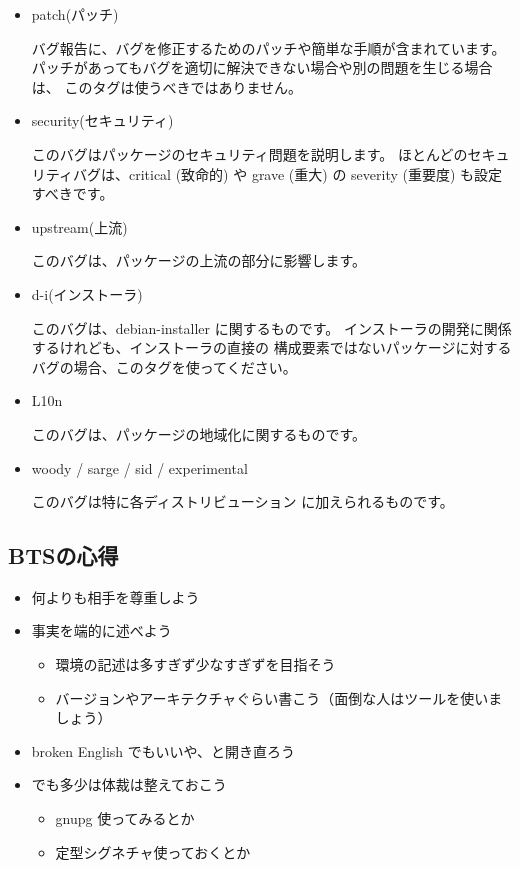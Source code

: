 \documentclass[mingoth,a4paper]{jsarticle}
\begin{document}
\begin{itemize}
\item patch(パッチ)

バグ報告に、バグを修正するためのパッチや簡単な手順が含まれています。 パッチがあってもバグを適切に解決できない場合や別の問題を生じる場合は、 このタグは使うべきではありません。 

\item security(セキュリティ)

このバグはパッケージのセキュリティ問題を説明します。 ほとんどのセキュリティバグは、critical (致命的) や grave (重大) の severity (重要度) も設定すべきです。 

\item upstream(上流)

このバグは、パッケージの上流の部分に影響します。

\item d-i(インストーラ)

 このバグは、debian-installer に関するものです。 インストーラの開発に関係するけれども、インストーラの直接の 構成要素ではないパッケージに対するバグの場合、このタグを使ってください。 

\item L10n

このバグは、パッケージの地域化に関するものです。 

\item woody / sarge / sid / experimental

このバグは特に各ディストリビューション に加えられるものです。
\end{itemize}

\subsection{BTSの心得}

\begin{itemize}
\item 何よりも相手を尊重しよう
\item 事実を端的に述べよう
\begin{itemize}
\item 環境の記述は多すぎず少なすぎずを目指そう
\item バージョンやアーキテクチャぐらい書こう（面倒な人はツールを使いましょう）
\end{itemize}
\item broken English でもいいや、と開き直ろう
\item でも多少は体裁は整えておこう
\begin{itemize}
\item gnupg 使ってみるとか
\item 定型シグネチャ使っておくとか
\end{itemize}
\end{itemize}
\end{document}
